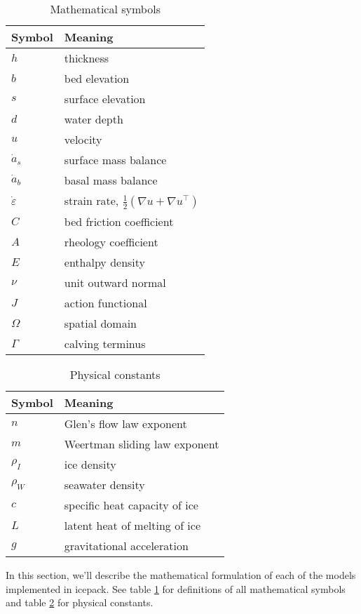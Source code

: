\documentclass[journal abbreviation, manuscript]{copernicus}
\begin{document}
\begin{table}[h]
    \begin{tabular}{l|l}
        Symbol & Meaning \\
        \hline
        $h$ & thickness \\
        $b$ & bed elevation  \\
        $s$ & surface elevation  \\
        $d$ & water depth \\
        $u$ & velocity \\
        $\dot a_s$ & surface mass balance \\
        $\dot a_b$ & basal mass balance \\
        $\dot\varepsilon$ & strain rate, $\frac{1}{2}(\nabla u + \nabla u^\top)$\\
        $C$ & bed friction coefficient \\
        $A$ & rheology coefficient \\
        $E$ & enthalpy density \\
        $\nu$ & unit outward normal \\
        $J$ & action functional \\
        $\Omega$ & spatial domain \\
        $\Gamma$ & calving terminus
    \end{tabular}
    \caption{Mathematical symbols}
    \label{tab:mathematical-symbols}
\end{table}

\begin{table}[h]
    \begin{tabular}{l|l}
        Symbol & Meaning \\
        \hline
        $n$ & Glen's flow law exponent \\
        $m$ & Weertman sliding law exponent \\
        $\rho_I$ & ice density \\
        $\rho_W$ & seawater density \\
        $c$ & specific heat capacity of ice \\
        $L$ & latent heat of melting of ice \\
        $g$ & gravitational acceleration
    \end{tabular}
    \caption{Physical constants}
    \label{tab:physical-constants}
\end{table}

In this section, we'll describe the mathematical formulation of each of the models implemented in icepack.
See table \ref{tab:mathematical-symbols} for definitions of all mathematical symbols and table \ref{tab:physical-constants} for physical constants.
\end{document}
